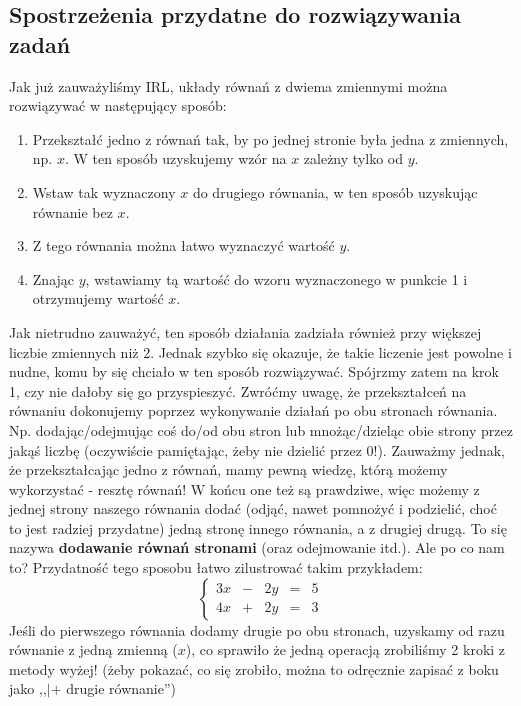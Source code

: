 \documentclass{article}
\theoremstyle{remark}
\begin{document}
\subsection{Spostrzeżenia przydatne do rozwiązywania zadań}
Jak już zauważyliśmy IRL, układy równań z dwiema zmiennymi można rozwiązywać w
następujący sposób:
\begin{enumerate}
  \item Przekształć jedno z równań tak, by po jednej stronie była
  jedna z zmiennych, np. $x$. W ten sposób uzyskujemy
  wzór na $x$ zależny tylko od $y$.
  \item Wstaw tak wyznaczony $x$ do drugiego równania,
  w ten sposób uzyskując równanie bez $x$.
  \item Z tego równania można łatwo wyznaczyć wartość $y$.
  \item Znając $y$, wstawiamy tą wartość do wzoru wyznaczonego w punkcie 1
  i otrzymujemy wartość $x$.
\end{enumerate}
Jak nietrudno zauważyć, ten sposób działania zadziała również przy większej
liczbie zmiennych niż 2. Jednak szybko się okazuje, że takie liczenie jest powolne
i nudne, komu by się chciało w ten sposób rozwiązywać. Spójrzmy zatem na krok 1, czy nie
dałoby się go przyspieszyć. Zwróćmy uwagę, że przekształceń na równaniu dokonujemy
poprzez wykonywanie działań po obu stronach równania. Np.
dodając/odejmując coś do/od obu stron lub mnożąc/dzieląc obie strony przez jakąś liczbę
(oczywiście pamiętając, żeby nie dzielić przez 0!).
Zauważmy jednak, że przekształcając jedno z równań, mamy pewną wiedzę,
którą możemy wykorzystać - resztę równań! W końcu one też są prawdziwe, więc możemy z
jednej strony naszego równania dodać
(odjąć, nawet pomnożyć i podzielić, choć to jest radziej przydatne)
jedną stronę innego równania, a z drugiej drugą.
To się nazywa \textbf{dodawanie równań stronami} (oraz odejmowanie itd.).
Ale po co nam to? Przydatność tego sposobu łatwo zilustrować takim przykładem:
\begin{displaymath}
  \left\{
    \begin{array}{lllll}
      3x &-& 2y &=& 5\\
      4x &+& 2y &=& 3
    \end{array}
    \right.
\end{displaymath}
Jeśli do pierwszego równania dodamy drugie po obu stronach, uzyskamy od razu
równanie z jedną zmienną ($x$),
co sprawiło że jedną operacją zrobiliśmy 2 kroki z metody wyżej!
(żeby pokazać, co się zrobiło, można to odręcznie zapisać z boku jako ,,$| +$ drugie równanie'')
\end{document}
